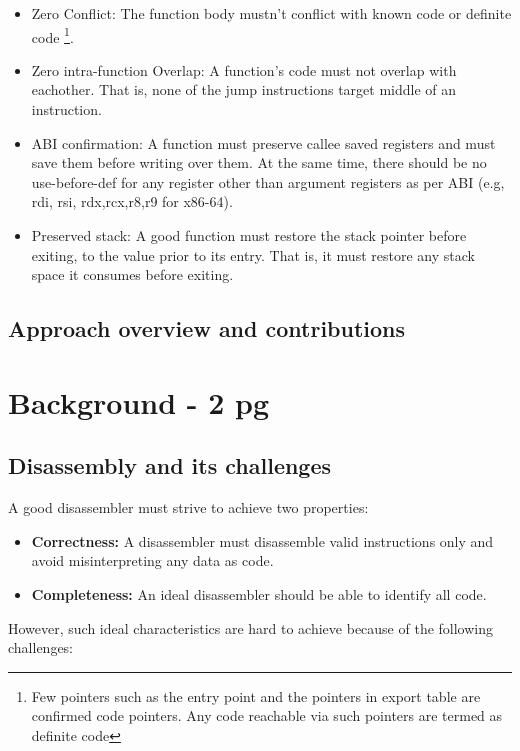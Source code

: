\begin{itemize}
  \item Zero Conflict: The function body mustn't conflict with known code or
    definite code \footnote{Few pointers such as the entry point and the
    pointers in export table are confirmed code pointers. Any code reachable via
    such pointers are termed as definite code}. 
  \item Zero intra-function Overlap: A function's code must not overlap with
    eachother. That is, none of the jump instructions target middle of an instruction.
  \item ABI confirmation: A function must preserve callee saved registers and
    must save them before writing over them. At the same time, there should be
    no use-before-def for any register other than argument registers as per ABI
    (e.g, rdi, rsi, rdx,rcx,r8,r9 for x86-64).
  \item Preserved stack: A good function must restore the stack pointer before
    exiting, to the value prior to its entry. That is, it must restore any stack
    space it consumes before exiting.
\end{itemize}

\subsection{Approach overview and contributions}

\section{Background - 2 pg}
\subsection{Disassembly and its challenges}
A good disassembler must strive to achieve two properties:
\begin{itemize}
  \item \textbf{Correctness:} A disassembler must disassemble valid instructions
    only and avoid misinterpreting any data as code.
  \item \textbf{Completeness:} An ideal disassembler should be able to identify
    all code.
\end{itemize}

However, such ideal characteristics are hard to achieve because of the following
challenges:


